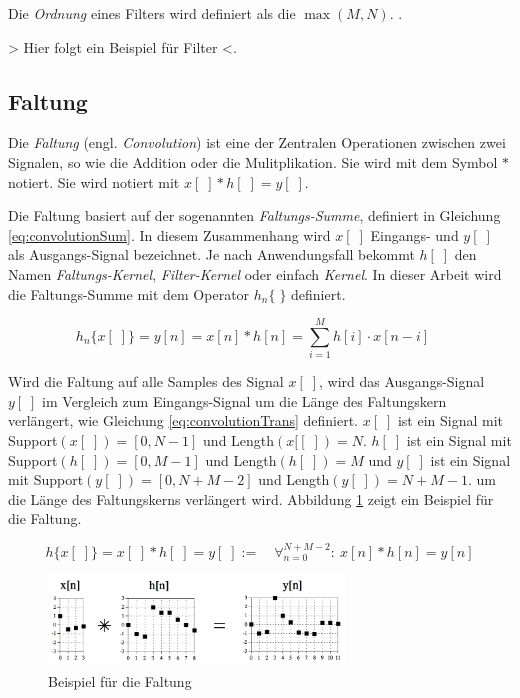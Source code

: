 Die \emph{Ordnung} eines Filters wird definiert als die $\max(M,N)$. \cite[\glqq Filter Order\grqq]{introductionToFilters}.

> Hier folgt ein Beispiel für Filter <.

\subsection{Faltung}
\label{sec:convolution}

Die \emph{Faltung} (engl. \emph{Convolution}) ist eine der Zentralen Operationen zwischen zwei Signalen, so wie die Addition oder die Mulitplikation. Sie wird mit dem Symbol $*$ notiert. Sie wird notiert mit $x[\;]* h[\;] = y[\;]$. 

Die Faltung basiert auf der sogenannten \emph{Faltungs-Summe}, definiert in Gleichung \ref{eq:convolutionSum}. In diesem Zusammenhang wird $x[\;]$ Eingangs- und $y[\;]$ als Ausgangs-Signal bezeichnet. Je nach Anwendungsfall bekommt $h[\;]$ den Namen \emph{Faltungs-Kernel}, \emph{Filter-Kernel} oder einfach \emph{Kernel}. In dieser Arbeit wird die Faltungs-Summe mit dem Operator $h_n\{\;\}$ definiert. \cite[S. 107-108]{dspGuide}

\begin{equation}
h_n\{x[\;]\} = y[n] = x[n] * h[n] = \sum_{i=1}^{M} h[i] \cdot x[n-i] \quad
\label{eq:convolutionSum}
\end{equation}

Wird die Faltung auf alle Samples des Signal $x[\;]$, wird das Ausgangs-Signal $y[\;]$ im Vergleich zum Eingangs-Signal um die Länge des Faltungskern verlängert, wie Gleichung \ref{eq:convolutionTrans} definiert. $x[\;]$ ist ein Signal mit Support$(x[\;]) = [0,N-1]$ und Length$(x[[\;]) = N$. $h[\;]$ ist ein Signal mit Support$(h[\;]) = [0,M-1]$ und Length$(h[\;]) = M$ und $y[\;]$ ist ein Signal mit Support$(y[\;]) = [0,N+M-2]$ und Length$(y[\;]) = N+M-1$.  um die Länge des Faltungskerns verlängert wird. Abbildung 	\ref{img:convolutionExample} zeigt ein Beispiel für die Faltung.\cite[S. 115-120]{dspGuide}

\begin{equation}
h\{x[\;]\} = x[\;] *  h[\;] =  y[\;] := \quad \mathop{\forall}_{n = 0}^{N+M-2} :\ x[n] * h[n] = y[n]
\label{eq:convolutionTrans}
\end{equation}

\begin{figure}[h]
	\centering
	\includegraphics[width=0.7\textwidth]{bilder/convolutionExample.png}
	\caption{Beispiel für die Faltung}
	\label{img:convolutionExample}
\end{figure}

